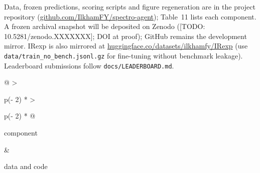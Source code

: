 \documentclass[
  10pt,
]{article}
\begin{document}
Data, frozen predictions, scoring scripts and figure regeneration are in
the project repository
(\href{https://github.com/IlkhamFY/spectro-agent}{github.com/IlkhamFY/spectro-agent});
Table~11 lists each component. A frozen archival snapshot will be
deposited on Zenodo ({[}TODO: 10.5281/zenodo.XXXXXXX{]}; DOI at proof);
GitHub remains the development mirror. IRexp is also mirrored at
\href{https://huggingface.co/datasets/ilkhamfy/IRexp}{huggingface.co/datasets/ilkhamfy/IRexp}
(use \texttt{data/\hspace{0pt}train\_no\_bench.jsonl.gz} for fine-tuning
without benchmark leakage). Leaderboard submissions follow
\texttt{docs/\hspace{0pt}LEADERBOARD.md}.

\begin{table}[htbp]
\centering\small
\caption*{\textbf{Table 11. Headline released artefacts.} Script-level inventory lives in the repository README.}
\begin{tabular}{@{}
  >{\raggedright\arraybackslash}p{(\textwidth - 2\tabcolsep) * }
  >{\raggedright\arraybackslash}p{(\textwidth - 2\tabcolsep) * }@{}}
\toprule
\begin{minipage}[b]{\linewidth}\raggedright
component
\end{minipage} & \begin{minipage}[b]{\linewidth}\raggedright
data and code
\end{minipage} \\
\midrule


\end{tabular}
\end{table}
\end{document}
